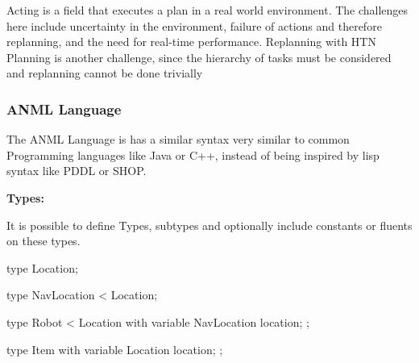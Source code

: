 Acting is a field that executes a plan in a real world environment.
The challenges here include uncertainty in the environment, failure of actions and therefore replanning, and the need for real-time performance.
Replanning with HTN Planning is another challenge, since the hierarchy of tasks must be considered and replanning cannot be done trivially


\subsubsection{ANML Language}

\lstset{
  language=ANML,
  style=anmlStyle,
}

The ANML Language is has a similar syntax very similar to common Programming languages like Java or C++, instead of being inspired by lisp syntax like PDDL or SHOP.

{\bf Types:}

It is possible to define Types, subtypes and optionally include constants or fluents on these types.








\begin{anmlcode}
type Location;

type NavLocation < Location;

type Robot < Location with {
  variable NavLocation location;
};

type Item with {
  variable Location location;
};
\end{anmlcode}



